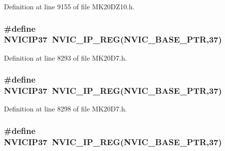 Definition at line 9155 of file M\+K20\+D\+Z10.\+h.

\subsubsection[{\texorpdfstring{N\+V\+I\+C\+I\+P37}{NVICIP37}}]{\setlength{\rightskip}{0pt plus 5cm}\#define N\+V\+I\+C\+I\+P37~{\bf N\+V\+I\+C\+\_\+\+I\+P\+\_\+\+R\+EG}({\bf N\+V\+I\+C\+\_\+\+B\+A\+S\+E\+\_\+\+P\+TR},37)}\hypertarget{group___n_v_i_c___register___accessor___macros_ga511a18a3f0e39a5090515728b94a60ec}{}\label{group___n_v_i_c___register___accessor___macros_ga511a18a3f0e39a5090515728b94a60ec}


Definition at line 8293 of file M\+K20\+D7.\+h.

\subsubsection[{\texorpdfstring{N\+V\+I\+C\+I\+P37}{NVICIP37}}]{\setlength{\rightskip}{0pt plus 5cm}\#define N\+V\+I\+C\+I\+P37~{\bf N\+V\+I\+C\+\_\+\+I\+P\+\_\+\+R\+EG}({\bf N\+V\+I\+C\+\_\+\+B\+A\+S\+E\+\_\+\+P\+TR},37)}\hypertarget{group___n_v_i_c___register___accessor___macros_ga511a18a3f0e39a5090515728b94a60ec}{}\label{group___n_v_i_c___register___accessor___macros_ga511a18a3f0e39a5090515728b94a60ec}


Definition at line 8298 of file M\+K20\+D7.\+h.

\subsubsection[{\texorpdfstring{N\+V\+I\+C\+I\+P37}{NVICIP37}}]{\setlength{\rightskip}{0pt plus 5cm}\#define N\+V\+I\+C\+I\+P37~{\bf N\+V\+I\+C\+\_\+\+I\+P\+\_\+\+R\+EG}({\bf N\+V\+I\+C\+\_\+\+B\+A\+S\+E\+\_\+\+P\+TR},37)}\hypertarget{group___n_v_i_c___register___accessor___macros_ga511a18a3f0e39a5090515728b94a60ec}{}\label{group___n_v_i_c___register___accessor___macros_ga511a18a3f0e39a5090515728b94a60ec}


